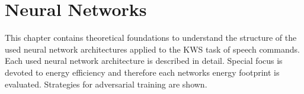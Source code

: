 
\chapter{Neural Networks}\label{sec:nn}
This chapter contains theoretical foundations to understand the structure of the used neural network architectures applied to the KWS task of speech commands.
Each used neural network architecture is described in detail.
Special focus is devoted to energy efficiency and therefore each networks energy footprint is evaluated.
Strategies for adversarial training are shown.






